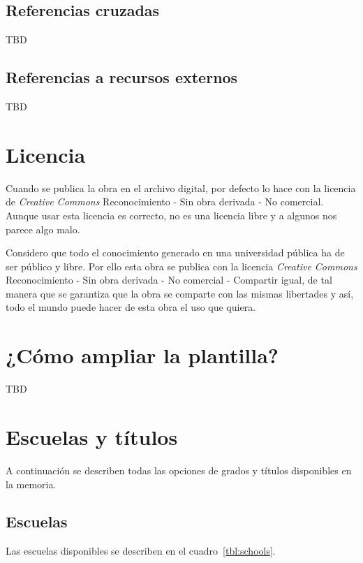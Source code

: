 \documentclass[%
    school=etsisi,%
    type=pfg,%
    degree=61CI,%
]{upm-report}
\begin{document}
\section{Referencias cruzadas}

TBD

\section{Referencias a recursos externos}

TBD

\chapter{Licencia}
\label{ch:licencia}

Cuando se publica la obra en el archivo digital, por defecto lo hace con la licencia de \textit{Creative Commons} Reconocimiento - Sin obra derivada - No comercial. Aunque usar esta licencia es correcto, no es una licencia libre y a algunos nos parece algo malo.

Considero que todo el conocimiento generado en una universidad pública ha de ser público y libre. Por ello esta obra se publica con la licencia \textit{Creative Commons} Reconocimiento - Sin obra derivada - No comercial - Compartir igual, de tal manera que se garantiza que la obra se comparte con las mismas libertades y así, todo el mundo puede hacer de esta obra el uso que quiera.

\appendix

\chapter{¿Cómo ampliar la plantilla?}
\label{ch:ampliar}

TBD

\chapter{Escuelas y títulos}
\label{ch:escuelas-y-titulos}

A continuación se describen todas las opciones de grados y títulos disponibles en la memoria.

\section{Escuelas}

Las escuelas disponibles se describen en el cuadro~\ref{tbl:schools}.
\end{document}
